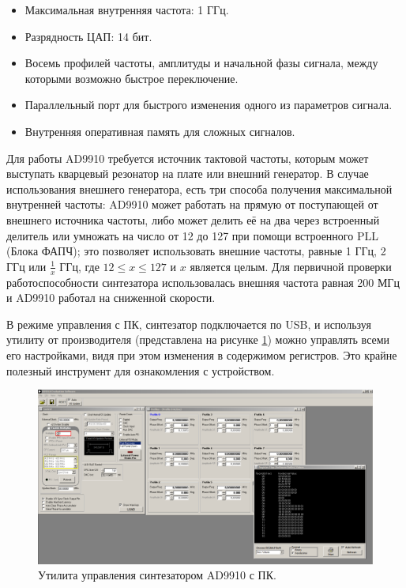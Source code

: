 \documentclass[rusmathsym, eqnumwithinsec, amspack, hyperref]{bomgost}
\begin{document}
\begin{itemize}
	\item Максимальная внутренняя частота: 1 ГГц.
	\item Разрядность ЦАП: 14 бит.
	\item Восемь профилей частоты, амплитуды и начальной фазы сигнала, между которыми возможно быстрое переключение.
	\item Параллельный порт для быстрого изменения одного из параметров сигнала.
	\item Внутренняя оперативная память для сложных сигналов.
\end{itemize}

Для работы AD9910 требуется источник тактовой частоты, которым может выступать кварцевый резонатор на плате или внешний генератор. В случае использования внешнего генератора, есть три способа получения максимальной внутренней частоты: AD9910 может работать на прямую от поступающей от внешнего источника частоты, либо может делить её на два через встроенный делитель или умножать на число от 12 до 127 при помощи встроенного PLL (Блока ФАПЧ); это позволяет использовать внешние частоты, равные 1 ГГц, 2 ГГц или $\frac{1}{x}$ ГГц, где $12 \leq x \leq 127$ и $x$ является целым. Для первичной проверки работоспособности синтезатора использовалась внешняя частота равная 200 МГц и AD9910 работал на сниженной скорости.

В режиме управления с ПК, синтезатор подключается по USB, и используя утилиту от производителя (представлена на рисунке \ref{fig:ad9910_evaluation_software}) можно управлять всеми его настройками, видя при этом изменения в содержимом регистров. Это крайне полезный инструмент для ознакомления с устройством.

\begin{gostfigure}
\begin{figure}[H]
\centering
\includegraphics[scale=.25]{data/ad9910_evaluation_software.png}
\caption{Утилита управления синтезатором AD9910 с ПК.}
\label{fig:ad9910_evaluation_software}
\end{figure}
\end{gostfigure}
\end{document}
